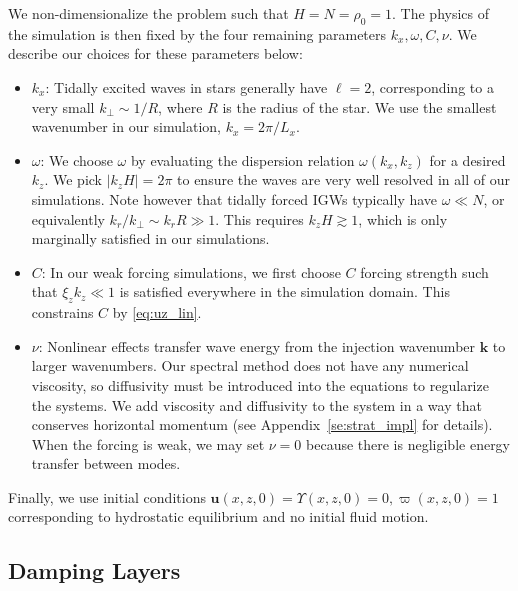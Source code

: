 \documentclass[
        fleqn,
        usenatbib,
    ]{mnras}
\newcommand*{\abs}[1]{\left|#1\right|}
\newcommand*{\bm}[1]{\mathbf{#1}}
\begin{document}
We non-dimensionalize the problem such that $H = N = \rho_0 = 1$. The physics of
the simulation is then fixed by the four remaining parameters $k_{x}, \omega, C,
\nu$. We describe our choices for these parameters below:
\begin{itemize}
    \item $k_{x}$: Tidally excited waves in stars generally have $\ell = 2$,
        corresponding to a very small $k_\perp\sim 1/R$, where $R$ is the radius
        of the star. We use the smallest wavenumber in our simulation,
        $k_x=2\pi/L_x$.

    \item $\omega$: We choose $\omega$ by evaluating the dispersion relation
        $\omega(k_x, k_z)$ for a desired $k_z$. We pick $\abs{k_z H} = 2\pi$ to
        ensure the waves are very well resolved in all of our simulations. Note
        however that tidally forced IGWs typically have $\omega \ll N$, or
        equivalently $k_r/k_\perp \sim k_r R \gg 1$. This requires $k_z H
        \gtrsim 1$, which is only marginally satisfied in our simulations.

    \item $C$: In our weak forcing simulations, we first choose $C$ forcing
        strength such that $\xi_z k_z \ll 1$ is satisfied everywhere in the
        simulation domain. This constrains $C$ by \autoref{eq:uz_lin}.

    \item $\nu$: Nonlinear effects transfer wave energy from the injection
        wavenumber $\bm{k}$ to larger wavenumbers. Our spectral method does not
        have any numerical viscosity, so diffusivity must be introduced into the
        equations to regularize the systems. We add viscosity and diffusivity to
        the system in a way that conserves horizontal momentum (see
        Appendix~\ref{se:strat_impl} for details). When the forcing is weak, we
        may set $\nu=0$ because there is negligible energy transfer between
        modes.
\end{itemize}

Finally, we use initial conditions $\bm{u}(x, z, 0) = \Upsilon(x, z, 0) = 0,
\varpi(x, z, 0) = 1$ corresponding to hydrostatic equilibrium and no initial
fluid motion.

\subsection{Damping Layers}\label{ss:damping}
\end{document}
